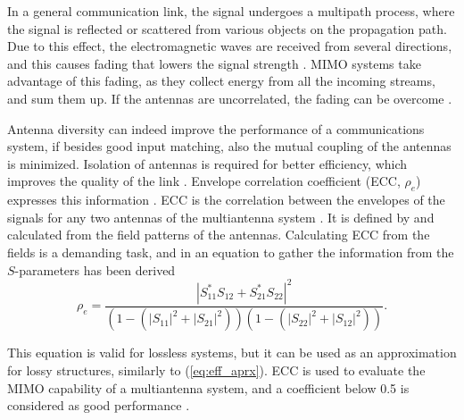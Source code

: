In a general communication link, the signal undergoes a multipath process, where the signal is reflected or scattered from various objects on the propagation path. Due to this effect, the electromagnetic waves are received from several directions, and this causes fading that lowers the signal strength \cite{saunders,volakis}. MIMO systems take advantage of this fading, as they collect energy from all the incoming streams, and sum them up. If the antennas are uncorrelated, the fading can be overcome \cite{volakis}.

Antenna diversity can indeed improve the performance of a communications system, if besides good input matching, also the mutual coupling of the antennas is minimized. Isolation of antennas is required for better efficiency, which improves the quality of the link \cite{high_order_mimo}. Envelope correlation coefficient (ECC, $\rho_e$) expresses this information \cite{ecc_paper,mimo_sibille}. ECC is the correlation between the envelopes of the signals for any two antennas of the multiantenna system \cite{mimo_sibille, high_order_mimo}. It is defined by and calculated from the field patterns of the antennas. Calculating ECC from the fields is a demanding task, and in \cite{ecc_paper} an equation to gather the information from the $S$-parameters has been derived
\begin{equation}
\label{eq:ecc}
    \rho_e = \frac{|S_{11}^*S_{12}+S_{21}^*S_{22}|^2}{(1-(|S_{11}|^2+|S_{21}|^2))(1-(|S_{22}|^2+|S_{12}|^2))}.
\end{equation}

This equation is valid for lossless systems, but it can be used as an approximation for lossy structures, similarly to (\ref{eq:eff_aprx}). ECC is used to evaluate the MIMO capability of a multiantenna system, and a coefficient below 0.5 is considered as good performance \cite{reduce_ecc,reduce_ecc2}.


\clearpage